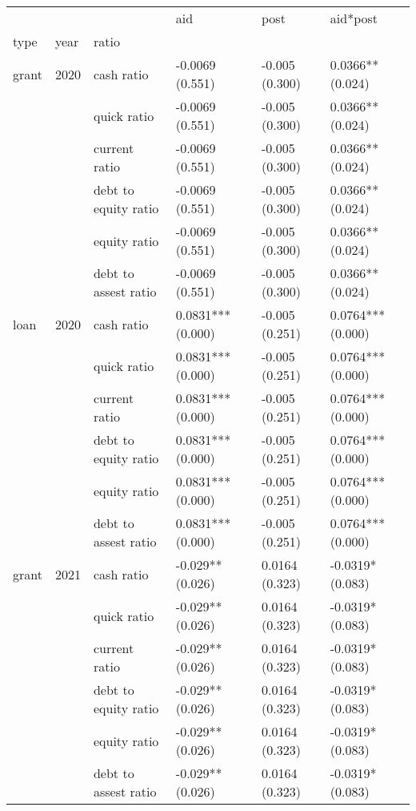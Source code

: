 \begin{tabular}{llllll}
\toprule
     &      &                      &                aid &            post &           aid*post \\
type & year & ratio &                    &                 &                    \\
\midrule
grant & 2020 & cash ratio &    -0.0069 (0.551) &  -0.005 (0.300) &   0.0366** (0.024) \\
     &      & quick ratio &    -0.0069 (0.551) &  -0.005 (0.300) &   0.0366** (0.024) \\
     &      & current ratio &    -0.0069 (0.551) &  -0.005 (0.300) &   0.0366** (0.024) \\
     &      & debt to equity ratio &    -0.0069 (0.551) &  -0.005 (0.300) &   0.0366** (0.024) \\
     &      & equity ratio &    -0.0069 (0.551) &  -0.005 (0.300) &   0.0366** (0.024) \\
     &      & debt to assest ratio &    -0.0069 (0.551) &  -0.005 (0.300) &   0.0366** (0.024) \\
loan & 2020 & cash ratio &  0.0831*** (0.000) &  -0.005 (0.251) &  0.0764*** (0.000) \\
     &      & quick ratio &  0.0831*** (0.000) &  -0.005 (0.251) &  0.0764*** (0.000) \\
     &      & current ratio &  0.0831*** (0.000) &  -0.005 (0.251) &  0.0764*** (0.000) \\
     &      & debt to equity ratio &  0.0831*** (0.000) &  -0.005 (0.251) &  0.0764*** (0.000) \\
     &      & equity ratio &  0.0831*** (0.000) &  -0.005 (0.251) &  0.0764*** (0.000) \\
     &      & debt to assest ratio &  0.0831*** (0.000) &  -0.005 (0.251) &  0.0764*** (0.000) \\
grant & 2021 & cash ratio &   -0.029** (0.026) &  0.0164 (0.323) &   -0.0319* (0.083) \\
     &      & quick ratio &   -0.029** (0.026) &  0.0164 (0.323) &   -0.0319* (0.083) \\
     &      & current ratio &   -0.029** (0.026) &  0.0164 (0.323) &   -0.0319* (0.083) \\
     &      & debt to equity ratio &   -0.029** (0.026) &  0.0164 (0.323) &   -0.0319* (0.083) \\
     &      & equity ratio &   -0.029** (0.026) &  0.0164 (0.323) &   -0.0319* (0.083) \\
     &      & debt to assest ratio &   -0.029** (0.026) &  0.0164 (0.323) &   -0.0319* (0.083) \\

\end{tabular}
